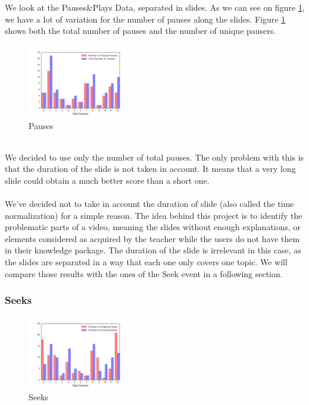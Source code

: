 \documentclass[11pt,a4paper]{article}
\begin{document}
We look at the Pauses\&Plays Data, separated in slides. As we can see on figure \ref{bintree}, we have a lot of variation for the number of pauses along the slides. Figure \ref{bintree} shows both the total number of pauses and the number of unique pausers.
\begin{figure} %
\centering
\includegraphics[width=0.4\textwidth]{pictures/pauses.png}
\caption{Pauses}
\label{bintree}
\end{figure} \\
We decided to use only the number of total pauses. The only problem with this is that the duration of the slide is not taken in account. It means that a very long slide could obtain a much better score than a short one. \\
\\
We've decided not to take in account the duration of slide (also called the time normalization) for a simple reason. The idea behind this project is to identify the problematic parts of a video, meaning the slides without enough explanations, or elements considered as acquired by the teacher while the users do not have them in their knowledge package. The duration of the slide is irrelevant in this case, as the slides are separated in a way that each one only covers one topic. We will compare those results with the ones of the Seek event in a following section.

\subsubsection{Seeks}

\begin{figure} %
\centering
\includegraphics[width=0.4\textwidth]{pictures/seeks.png}
\caption{Seeks}
\label{seeks}
\end{figure} 
\end{document}
